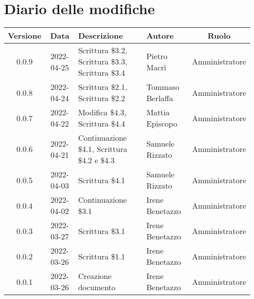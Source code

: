 \section*{Diario delle modifiche}
	\begin{center}
	\renewcommand{\arraystretch}{1.8} %
	\begin{tabular}{ |c|c|m{12em}|m{7em}|c| }
	\hline
	\textbf{Versione} & \textbf{Data} & \textbf{Descrizione} &  \textbf{Autore} &  \textbf{Ruolo} \\ %
	\hline
	0.0.9 & 2022-04-25 & Scrittura \$3.2, Scrittura \$3.3, Scrittura \$3.4 & Pietro Macrì & Amministratore\\
	\hline
	0.0.8 & 2022-04-24 & Scrittura \$2.1, Scrittura \$2.2 & Tommaso \newline Berlaffa & Amministratore\\
	\hline
	0.0.7 & 2022-04-22 & Modifica \$4.3, Scrittura \$4.4 & Mattia \newline Episcopo & Amministratore\\
	\hline
	0.0.6 & 2022-04-21 & Continuazione \$4.1, Scrittura \$4.2 e \$4.3 & Samuele \newline Rizzato & Amministratore\\ %
	\hline
	0.0.5 & 2022-04-03 & Scrittura \$4.1 & Samuele \newline Rizzato & Amministratore\\
	\hline
	0.0.4 & 2022-04-02 & Continuazione \$3.1 & Irene Benetazzo & Amministratore\\
	\hline
	0.0.3 & 2022-03-27 & Scrittura \$3.1 & Irene Benetazzo & Amministratore\\
	\hline
	0.0.2 & 2022-03-26 & Scrittura \$1.1 & Irene Benetazzo & Amministratore\\
	\hline
    0.0.1 & 2022-03-26 & Creazione documento & Irene Benetazzo & Amministratore\\
	\hline
	\end{tabular}
	\end{center}
	\newpage